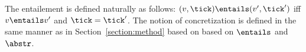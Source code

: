 %
%
%
%


The entailement is defined naturally as follows: %
$(v,\tick)\entails(v',\tick')$ iff $v\entails v'$ and $\tick =
\tick'$.
%
The notion of concretization is defined in
the same manner as in Section~\ref{section:method} based on
based on $\entails$ and $\abstr$.

